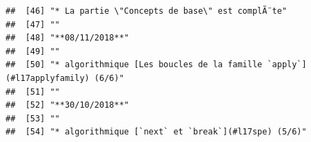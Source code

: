 \documentclass[]{book}
\begin{document}
\begin{verbatim}
##  [46] "* La partie \"Concepts de base\" est complÃ¨te"                                                                                                                                                                                                                                                             
##  [47] ""                                                                                                                                                                                                                                                                                                           
##  [48] "**08/11/2018**"                                                                                                                                                                                                                                                                                             
##  [49] ""                                                                                                                                                                                                                                                                                                           
##  [50] "* algorithmique [Les boucles de la famille `apply`](#l17applyfamily) (6/6)"                                                                                                                                                                                                                                 
##  [51] ""                                                                                                                                                                                                                                                                                                           
##  [52] "**30/10/2018**"                                                                                                                                                                                                                                                                                             
##  [53] ""                                                                                                                                                                                                                                                                                                           
##  [54] "* algorithmique [`next` et `break`](#l17spe) (5/6)"                                                                                                                                                                                                                                                         

\end{verbatim}
\end{document}
